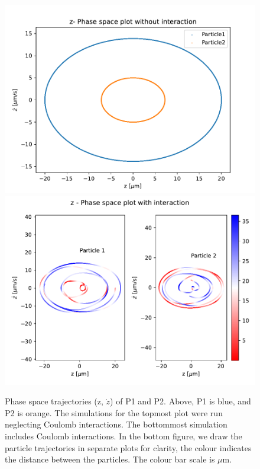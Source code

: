 \begin{figure}
\centering
\includegraphics[scale = 0.7]{../figures/z_phase_noint.pdf}
\includegraphics[scale = 0.7]{../figures/z_phase_int.pdf}
\caption{Phase space trajectories (z, $\dot{z}$) of P1 and P2. Above, P1 is blue, and P2 is orange.
The simulations for the topmost plot were run neglecting Coulomb interactions. The bottommost simulation includes Coulomb interactions. In the bottom figure, we draw the particle trajectories in
separate plots for clarity, the colour indicates the distance between the particles. The colour bar scale is
$\mu$m.}
\label{fig:phase_z}
\end{figure}

